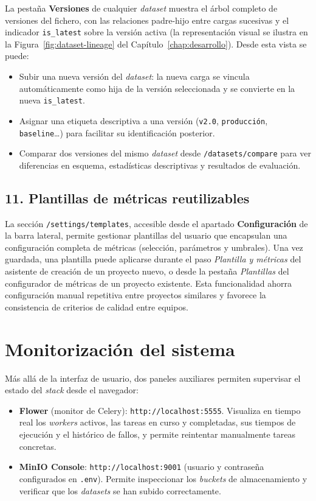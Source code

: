 La pestaña \textbf{Versiones} de cualquier \emph{dataset} muestra el
árbol completo de versiones del fichero, con las relaciones
padre-hijo entre cargas sucesivas y el indicador
\texttt{is\_latest} sobre la versión activa (la representación
visual se ilustra en la Figura~\ref{fig:dataset-lineage} del
Capítulo~\ref{chap:desarrollo}).  Desde esta vista se puede:

\begin{itemize}
  \item Subir una nueva versión del \emph{dataset}: la nueva carga
    se vincula automáticamente como hija de la versión seleccionada
    y se convierte en la nueva \texttt{is\_latest}.
  \item Asignar una etiqueta descriptiva a una versión
    (\texttt{v2.0}, \texttt{producción}, \texttt{baseline}\ldots)
    para facilitar su identificación posterior.
  \item Comparar dos versiones del mismo \emph{dataset} desde
    \texttt{/datasets/compare} para ver diferencias en esquema,
    estadísticas descriptivas y resultados de evaluación.
\end{itemize}

\subsection*{11. Plantillas de métricas reutilizables}

La sección \texttt{/settings/templates}, accesible desde el
apartado \textbf{Configuración} de la barra lateral, permite
gestionar plantillas del usuario que encapsulan una configuración
completa de métricas (selección, parámetros y umbrales).  Una vez
guardada, una plantilla puede aplicarse durante el paso
\emph{Plantilla y métricas} del asistente de creación de un proyecto
nuevo, o desde la pestaña \emph{Plantillas} del configurador de
métricas de un proyecto existente.  Esta funcionalidad ahorra
configuración manual repetitiva entre proyectos similares y
favorece la consistencia de criterios de calidad entre equipos.

\section{Monitorización del sistema}

Más allá de la interfaz de usuario, dos paneles auxiliares permiten
supervisar el estado del \emph{stack} desde el navegador:

\begin{itemize}
  \item \textbf{Flower} (monitor de Celery):
    \texttt{http://localhost:5555}.  Visualiza en tiempo real los
    \emph{workers} activos, las tareas en curso y completadas, sus
    tiempos de ejecución y el histórico de fallos, y permite
    reintentar manualmente tareas concretas.
  \item \textbf{MinIO Console}: \texttt{http://localhost:9001}
    (usuario y contraseña configurados en \texttt{.env}).  Permite
    inspeccionar los \emph{buckets} de almacenamiento y verificar
    que los \emph{datasets} se han subido correctamente.
\end{itemize}

